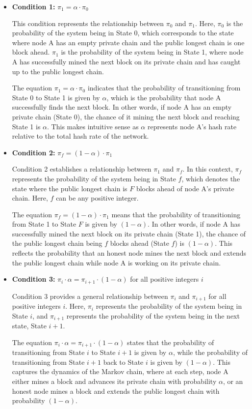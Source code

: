 \begin{itemize}
    \item \textbf{Condition 1:} $\pi_1 = \alpha \cdot \pi_0$

    This condition represents the relationship between $\pi_0$ and $\pi_1$. Here, $\pi_0$ is the probability of the system being in State 0, which corresponds to the state where node A has an empty private chain and the public longest chain is one block ahead. $\pi_1$ is the probability of the system being in State 1, where node A has successfully mined the next block on its private chain and has caught up to the public longest chain.
    
    The equation $\pi_1 = \alpha \cdot \pi_0$ indicates that the probability of transitioning from State 0 to State 1 is given by $\alpha$, which is the probability that node A successfully finds the next block. In other words, if node A has an empty private chain (State 0), the chance of it mining the next block and reaching State 1 is $\alpha$. This makes intuitive sense as $\alpha$ represents node A's hash rate relative to the total hash rate of the network.
    \item \textbf{Condition 2:} $\pi_f = (1 - \alpha) \cdot \pi_1$

    Condition 2 establishes a relationship between $\pi_1$ and $\pi_f$. In this context, $\pi_f$ represents the probability of the system being in State $f$, which denotes the state where the public longest chain is $F$ blocks ahead of node A's private chain. Here, $f$ can be any positive integer.
    
    The equation $\pi_f = (1 - \alpha) \cdot \pi_1$ means that the probability of transitioning from State 1 to State $F$ is given by $(1 - \alpha)$. In other words, if node A has successfully mined the next block on its private chain (State 1), the chance of the public longest chain being $f$ blocks ahead (State $f$) is $(1 - \alpha)$. This reflects the probability that an honest node mines the next block and extends the public longest chain while node A is working on its private chain.

    \item \textbf{Condition 3:} $\pi_i \cdot \alpha = \pi_{i+1} \cdot (1 - \alpha)$ for all positive integers $i$

    Condition 3 provides a general relationship between $\pi_i$ and $\pi_{i+1}$ for all positive integers $i$. Here, $\pi_i$ represents the probability of the system being in State $i$, and $\pi_{i+1}$ represents the probability of the system being in the next state, State $i+1$.
    
    The equation $\pi_i \cdot \alpha = \pi_{i+1} \cdot (1 - \alpha)$ states that the probability of transitioning from State $i$ to State $i+1$ is given by $\alpha$, while the probability of transitioning from State $i+1$ back to State $i$ is given by $(1 - \alpha)$. This captures the dynamics of the Markov chain, where at each step, node A either mines a block and advances its private chain with probability $\alpha$, or an honest node mines a block and extends the public longest chain with probability $(1 - \alpha)$.

\end{itemize}
